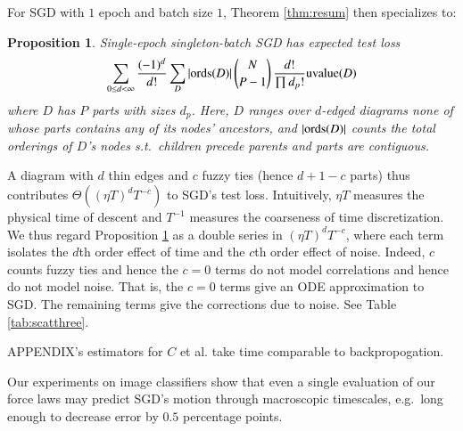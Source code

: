 \documentclass{article}
\theoremstyle{plain}
\newtheorem{prop}{Proposition}
\theoremstyle{definition}
\newcommand{\wrap}[1]{\left(#1\right)}
\newcommand{\uvalue}{\text{\textnormal{uvalue}}}
\newcommand{\ords}{\text{\textnormal{ords}}}
\begin{document}
        For SGD with $1$ epoch and batch size $1$, Theorem \ref{thm:resum} then
        specializes to: 
        \begin{prop} \label{prop:vanilla}
            Single-epoch singleton-batch SGD has expected test loss
            \begin{equation*}\label{eq:sgdbasiccoef}
                \sum_{0\leq d<\infty}
                \frac{(-1)^d}{d!} \sum_{D} 
                |\ords(D)| \, {N \choose P-1} \, \frac{d!}{\prod d_p!}
                \uvalue(D)
            \end{equation*}
            where $D$ has $P$ parts with sizes $d_p$.
            Here, $D$ ranges over $d$-edged diagrams none of whose parts
            contains any of its nodes' ancestors, and
            $|\ords(D)|$ counts the total orderings of $D$'s nodes s.t.\
            children precede parents and parts are contiguous.
        \end{prop}
        A diagram with $d$ thin edges and $c$ fuzzy ties (hence $d+1-c$
        parts) thus contributes $\Theta\wrap{(\eta T)^d T^{-c}}$ to SGD's test
        loss. 
        Intuitively, $\eta T$ measures the physical time of descent and
        $T^{-1}$ measures the coarseness of time discretization.  We thus
        regard Proposition \ref{prop:vanilla} as a double series in $(\eta T)^d
        T^{-c}$, where each term isolates the $d$th order effect of time and
        the $c$th order effect of noise.  Indeed, $c$ counts fuzzy ties and
        hence the $c=0$ terms do not model correlations and hence do not model
        noise.  That is, the $c=0$ terms give an ODE approximation to SGD.  The
        remaining terms give the corrections due to noise.  See Table
        \ref{tab:scatthree}. 

            {\color{red} APPENDIX}'s estimators for $C$ et al.
            take time comparable to backpropogation.
 
    Our experiments on image classifiers show that even a single evaluation of
    our force laws may predict SGD's motion through macroscopic timescales,
    e.g.\ long enough to decrease error by $0.5$ percentage points.
\end{document}
